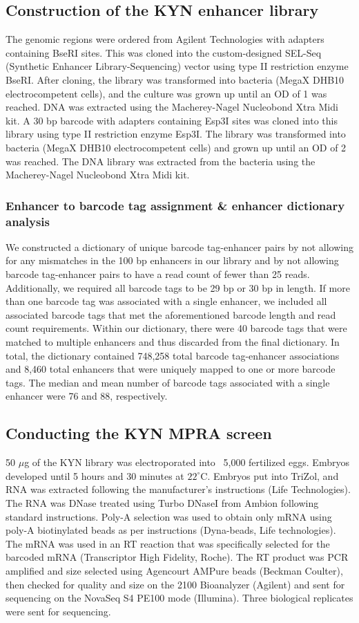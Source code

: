 \subsection{Construction of the KYN enhancer library}
The genomic regions were ordered from Agilent Technologies with adapters containing BseRI sites. This was cloned into the custom-designed SEL-Seq (Synthetic Enhancer Library-Sequencing) vector using type II restriction enzyme BseRI. After cloning, the library was transformed into bacteria (MegaX DHB10 electrocompetent cells), and the culture was grown up until an OD of 1 was reached. DNA was extracted using the Macherey-Nagel Nucleobond Xtra Midi kit. A 30 bp barcode with adapters containing Esp3I sites was cloned into this library using type II restriction enzyme Esp3I. The library was transformed into bacteria (MegaX DHB10 electrocompetent cells) and grown up until an OD of 2 was reached. The DNA library was extracted from the bacteria using the Macherey-Nagel Nucleobond Xtra Midi kit. 

\subsubsection{Enhancer to barcode tag assignment \& enhancer dictionary analysis}
We constructed a dictionary of unique barcode tag-enhancer pairs by not allowing for any mismatches in the 100 bp enhancers in our library and by not allowing barcode tag-enhancer pairs to have a read count of fewer than 25 reads. Additionally, we required all barcode tags to be 29 bp or 30 bp in length. If more than one barcode tag was associated with a single enhancer, we included all associated barcode tags that met the aforementioned barcode length and read count requirements. Within our dictionary, there were 40 barcode tags that were matched to multiple enhancers and thus discarded from the final dictionary. In total, the dictionary contained 748,258 total barcode tag-enhancer associations and 8,460 total enhancers that were uniquely mapped to one or more barcode tags. The median and mean number of barcode tags associated with a single enhancer were 76 and 88, respectively.  

\subsection{Conducting the KYN MPRA screen}
50 $\mu$g of the KYN library was electroporated into ~5,000 fertilized eggs. Embryos developed until 5 hours and 30 minutes at $22^\circ$C. Embryos put into TriZol, and RNA was extracted following the manufacturer's instructions (Life Technologies). The RNA was DNase treated using Turbo DNaseI from Ambion following standard instructions. Poly-A selection was used to obtain only mRNA using poly-A biotinylated beads as per instructions (Dyna-beads, Life technologies). The mRNA was used in an RT reaction that was specifically selected for the barcoded mRNA (Transcriptor High Fidelity, Roche). The RT product was PCR amplified and size selected using Agencourt AMPure beads (Beckman Coulter), then checked for quality and size on the 2100 Bioanalyzer (Agilent) and sent for sequencing on the NovaSeq S4 PE100 mode (Illumina). Three biological replicates were sent for sequencing. 

